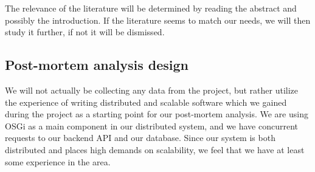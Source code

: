 \documentclass{article}
\begin{document}
The relevance of the literature will be determined by reading the abstract and
possibly the introduction. If the literature seems to match our needs, we will
then study it further, if not it will be dismissed.

\subsection{Post-mortem analysis design}
 
We will not actually be collecting any data from the project, but rather
utilize the experience of writing distributed and scalable software which we
gained during the project as a starting point for our post-mortem analysis. We
are using OSGi \cite{marples2001open} as a main component in our distributed
system, and we have concurrent requests to our backend API and our database.
Since our system is both distributed and places high demands on scalability, we
feel that we have at least some experience in the area.



 
\end{document}
